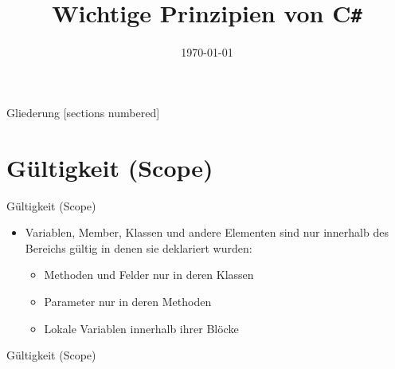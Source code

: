 



\title{Wichtige Prinzipien von C\texttt{\#}}
\date{\today}




\maketitle

\begin{frame}{Gliederung}
	[sections numbered]
	\tableofcontents
\end{frame}

\section{Gültigkeit (Scope)}
\begin{frame}{Gültigkeit (Scope)}
	\begin{itemize}
		\item Variablen, Member, Klassen und andere Elementen sind nur innerhalb des Bereichs gültig in denen sie deklariert wurden:
		\begin{itemize}
			\item Methoden und Felder nur in deren Klassen
			\item Parameter nur in deren Methoden
			\item Lokale Variablen innerhalb ihrer Blöcke
		\end{itemize}
	\end{itemize}
\end{frame}

\begin{frame}{Gültigkeit (Scope)}
	
\end{frame}

